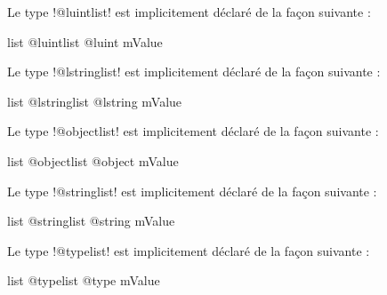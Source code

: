 
Le type \ggs!@luintlist! est implicitement déclaré de la façon suivante :

\begin{galgasbox}
list @luintlist {
  @luint mValue
}
\end{galgasbox}











Le type \ggs!@lstringlist! est implicitement déclaré de la façon suivante :

\begin{galgasbox}
list @lstringlist {
  @lstring mValue
}
\end{galgasbox}








Le type \ggs!@objectlist! est implicitement déclaré de la façon suivante :

\begin{galgasbox}
list @objectlist {
  @object mValue
}
\end{galgasbox}






Le type \ggs!@stringlist! est implicitement déclaré de la façon suivante :

\begin{galgasbox}
list @stringlist {
  @string mValue
}
\end{galgasbox}








Le type \ggs!@typelist! est implicitement déclaré de la façon suivante :

\begin{galgasbox}
list @typelist {
  @type mValue
}
\end{galgasbox}






